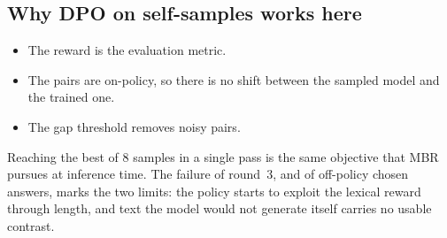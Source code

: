 \documentclass[11pt,a4paper]{article}
\begin{document}
\subsection{Why DPO on self-samples works here}
\begin{itemize}[leftmargin=*]
\item The reward is the evaluation metric.
\item The pairs are on-policy, so there is no shift between the sampled model and the trained one.
\item The gap threshold removes noisy pairs.
\end{itemize}
Reaching the best of $8$ samples in a single pass is the same objective that MBR pursues at inference time. The failure of round~3, and of off-policy chosen answers, marks the two limits: the policy starts to exploit the lexical reward through length, and text the model would not generate itself carries no usable contrast.
\end{document}
